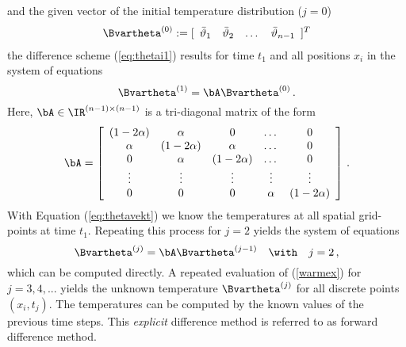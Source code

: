 %
and the given vector of the initial temperature
distribution ($j=0$) 
%
\begin{equation}
\Bvartheta^{(0)} := [ 
\begin{array}{cccc}
\bar\vartheta_1 & \bar\vartheta_2 & \dots & \bar\vartheta_{n-1}
\end{array}
]^T 
\end{equation}
%
the difference scheme (\ref{eq:thetai1}) results for 
time $t_1$ and all positions $x_i$ in the system of 
equations 
%
\begin{equation}
\Bvartheta^{(1)} = \bA \Bvartheta^{(0)} \, .
\label{eq:thetavekt}
\end{equation}
%
Here, $\bA \in \IR^{(n-1) \times (n-1)}$ is a tri-diagonal
matrix of the form
%
\begin{equation}
\bA =  \left[
\begin{array}{ccccc}
(1 - 2 \alpha) &     \alpha     &       0        & \dots  & 0      \\
     \alpha    & (1 - 2 \alpha) &    \alpha      & \dots  & 0      \\
      0        &     \alpha     & (1 - 2 \alpha) & \dots  & 0      \\
    \vdots     &     \vdots     &    \vdots      & \vdots & \vdots \\
       0       &      0         &        0       & \alpha & (1 - 2 \alpha)
\end{array} 
\right] \, .
\end{equation}
%
With Equation (\ref{eq:thetavekt}) we know the 
temperatures at all spatial grid-points at time $t_1$. 
Repeating this process for $j=2$ yields the 
system of equations 
%
\begin{equation}
 \Bvartheta^{(j)} = \bA \Bvartheta^{(j-1)} 
 \quad \with \quad j=2 \, ,
\label{warmex}
\end{equation}
%
which can be computed directly. 
A repeated evaluation of (\ref{warmex}) for $j = 3, 4, ...$
yields the unknown temperature $\Bvartheta^{(j)}$ for all
discrete points $(x_i, t_j)$. 
The temperatures can be computed by the known 
values of the previous time steps. 
This {\it explicit} difference method is referred to as 
forward difference method. 

%












